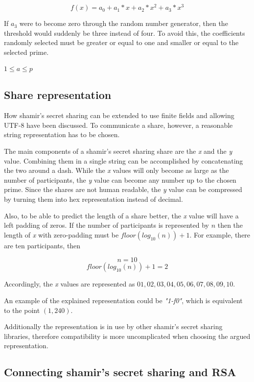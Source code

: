 $$f(x) = a_0 + a_1 * x + a_2 * x^2 + a_3 * x^3$$

If $a_3$ were to become zero through the random number generator, then the
threshold would suddenly be three instead of four. To avoid this, the
coefficients randomly selected must be greater or equal to one and smaller or
equal to the selected prime.

$1 \leq a \leq p$

\subsection{Share representation}

How shamir's secret sharing can be extended to use finite fields and allowing
UTF-8 have been discussed. To communicate a share, however, a reasonable string
representation has to be chosen.

The main components of a shamir's secret sharing share are the \textit{x} and
the \textit{y} value. Combining them in a single string can be accomplished by
concatenating the two around a dash. While the \textit{x} values will only
become as large as the number of participants, the \textit{y} value can become
any number up to the chosen prime. Since the shares are not human readable,
the \textit{y} value can be compressed by turning them into hex representation
instead of decimal.

Also, to be able to predict the length of a share better, the \textit{x} value
will have a left padding of zeros. If the number of participants is represented
by $n$ then the length of \textit{x} with zero-padding must be
$floor(log_{10}(n))+1$. For example, there are ten participants, then

$$n = 10$$
$$floor(log_{10}(n))+1 = 2$$

Accordingly, the \textit{x} values are represented as $01, 02, 03, 04, 05, 06,
07, 08, 09, 10$.

An example of the explained representation could be \textit{"1-f0"}, which is
equivalent to the point $(1, 240)$.

Additionally the representation is in use by other shamir's secret sharing
libraries, therefore compatibility is more uncomplicated when choosing the
argued representation.

\subsection{Connecting shamir's secret sharing and RSA}

